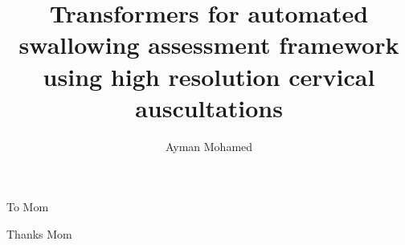 \documentclass{ut-thesis}
\author{Ayman Mohamed}
\title{Transformers for automated swallowing assessment framework using high resolution cervical auscultations}
\begin{document}
  \frontmatter
    \maketitle
    \begin{abstract}
      
    \end{abstract}
    \begin{dedication}
      To Mom
    \end{dedication}
    \begin{acknowledgements}
      Thanks Mom
    \end{acknowledgements}
    \tableofcontents
    \listoftables
    \listoffigures
  \mainmatter
    
    
    
  \appendix
    
  \backmatter
  \printbibliography[heading=bibintoc]
  \lipsum[1-6]
\end{document}
